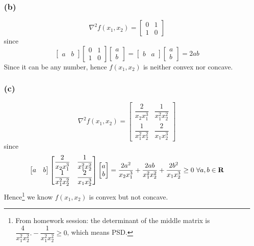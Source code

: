 \documentclass{article}
\newcommand{\reals}{{\mbox{\bf R}}}
\begin{document}
\subsubsection*{(b)}
\[ \nabla^2 f(x_1, x_2) = \begin{bmatrix}
0 & 1  \\
1 & 0 
\end{bmatrix}\]
since 
\[\begin{bmatrix}
a& b
\end{bmatrix}\begin{bmatrix}
0 & 1  \\
1 & 0 
\end{bmatrix}\begin{bmatrix}
a   \\
b 
\end{bmatrix} = \begin{bmatrix}
b& a
\end{bmatrix}\begin{bmatrix}
a   \\
b 
\end{bmatrix}  = 2ab\]
Since it can be any number, hence $f(x_1,x_2 )$ is neither convex nor concave.
\subsubsection*{(c)}
\[ \nabla^2 f(x_1, x_2) = \begin{bmatrix}
\dfrac{2}{x_2x_1^3} & \dfrac{1}{x_1^2x_2^2}  \\
 \dfrac{1}{x_1^2x_2^2} & \dfrac{2}{x_1x_2^3}
\end{bmatrix}\]
since 
\[\begin{bmatrix}
a& b
\end{bmatrix}\begin{bmatrix}
\dfrac{2}{x_2x_1^3} & \dfrac{1}{x_1^2x_2^2}  \\
 \dfrac{1}{x_1^2x_2^2} & \dfrac{2}{x_1x_2^3}
\end{bmatrix}\begin{bmatrix}
a   \\
b 
\end{bmatrix} = \dfrac{2a^2}{x_2x_1^3} + \dfrac{2ab}{x_1^2x_2^2}+ \dfrac{2b^2}{x_1x_2^3} \ge 0 \,\, \forall a,b \in \reals\]
Hence\footnote{From homework session: the determinant of the middle matrix is $\dfrac{4}{x_1^2x_2^2}. - \dfrac{1}{x_1^2x_2^2} \ge 0$, which means PSD.} we know  $f(x_1,x_2 )$ is convex but not concave.
\end{document}
